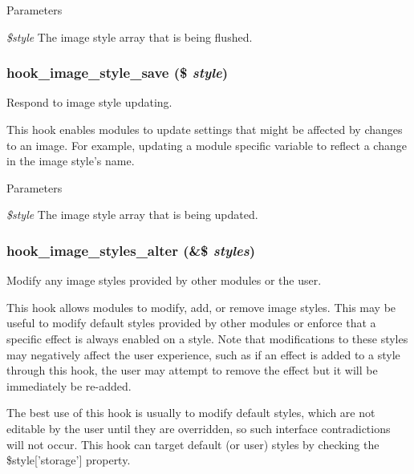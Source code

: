 \begin{DoxyParams}{Parameters}
\item[{\em \$style}]The image style array that is being flushed. \end{DoxyParams}
\hypertarget{group__hooks_gad403dde0a7859e160772ae696ab35cea}{
\subsubsection[{hook\_\-image\_\-style\_\-save}]{\setlength{\rightskip}{0pt plus 5cm}hook\_\-image\_\-style\_\-save (\$ {\em style})}}
\label{group__hooks_gad403dde0a7859e160772ae696ab35cea}
Respond to image style updating.

This hook enables modules to update settings that might be affected by changes to an image. For example, updating a module specific variable to reflect a change in the image style's name.


\begin{DoxyParams}{Parameters}
\item[{\em \$style}]The image style array that is being updated. \end{DoxyParams}
\hypertarget{group__hooks_gaf5549b8e546e9484c0de3093b49fea7d}{
\subsubsection[{hook\_\-image\_\-styles\_\-alter}]{\setlength{\rightskip}{0pt plus 5cm}hook\_\-image\_\-styles\_\-alter (\&\$ {\em styles})}}
\label{group__hooks_gaf5549b8e546e9484c0de3093b49fea7d}
Modify any image styles provided by other modules or the user.

This hook allows modules to modify, add, or remove image styles. This may be useful to modify default styles provided by other modules or enforce that a specific effect is always enabled on a style. Note that modifications to these styles may negatively affect the user experience, such as if an effect is added to a style through this hook, the user may attempt to remove the effect but it will be immediately be re-\/added.

The best use of this hook is usually to modify default styles, which are not editable by the user until they are overridden, so such interface contradictions will not occur. This hook can target default (or user) styles by checking the \$style\mbox{[}'storage'\mbox{]} property.

